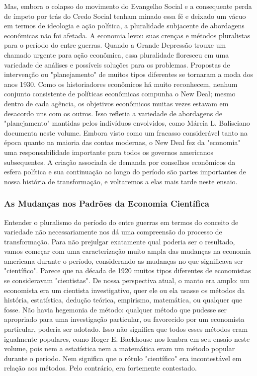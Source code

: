 \documentclass[a4paper,12pt]{article}[abntex2]
\begin{document}
Mas, embora o colapso do movimento do Evangelho Social e a consequente perda de ímpeto por trás do Credo Social tenham minado essa fé e deixado um vácuo em termos de ideologia e ação política, a pluralidade subjacente de abordagens econômicas não foi afetada. A economia levou suas crenças e métodos pluralistas para o período do entre guerras. Quando a Grande Depressão trouxe um chamado urgente para ação econômica, essa pluralidade floresceu em uma variedade de análises e possíveis soluções para os problemas. Propostas de intervenção ou "planejamento" de muitos tipos diferentes se tornaram a moda dos anos 1930. Como os historiadores econômicos há muito reconhecem, nenhum conjunto consistente de políticas econômicas compunha o New Deal; mesmo dentro de cada agência, os objetivos econômicos muitas vezes estavam em desacordo uns com os outros. Isso refletia a variedade de abordagens de "planejamento" mantidas pelos indivíduos envolvidos, como Márcia L. Balisciano documenta neste volume. Embora visto como um fracasso considerável tanto na época quanto na maioria das contas modernas, o New Deal fez da "economia" uma responsabilidade importante para todos os governos americanos subsequentes. A criação associada de demanda por conselhos econômicos da esfera política e sua continuação ao longo do período são partes importantes de nossa história de transformação, e voltaremos a elas mais tarde neste ensaio.

\subsubsection{\textbf{As Mudanças nos Padrões da Economia Científica}}


Entender o pluralismo do período do entre guerras em termos do conceito de variedade não necessariamente nos dá uma compreensão do processo de transformação. Para não prejulgar exatamente qual poderia ser o resultado, vamos começar com uma caracterização muito ampla das mudanças na economia americana durante o período, considerando as mudanças no que significava ser "científico". Parece que na década de 1920 muitos tipos diferentes de economistas se consideravam "cientistas". De nossa perspectiva atual, o manto era amplo: um economista era um cientista investigativo, quer ele ou ela usasse os métodos da história, estatística, dedução teórica, empirismo, matemática, ou qualquer que fosse. Não havia hegemonia de método: qualquer método que pudesse ser apropriado para uma investigação particular, ou favorecido por um economista particular, poderia ser adotado. Isso não significa que todos esses métodos eram igualmente populares, como Roger E. Backhouse nos lembra em seu ensaio neste volume, pois nem a estatística nem a matemática eram um método popular durante o período. Nem significa que o rótulo "científico" era incontestável em relação aos métodos. Pelo contrário, era fortemente contestado.
\end{document}
